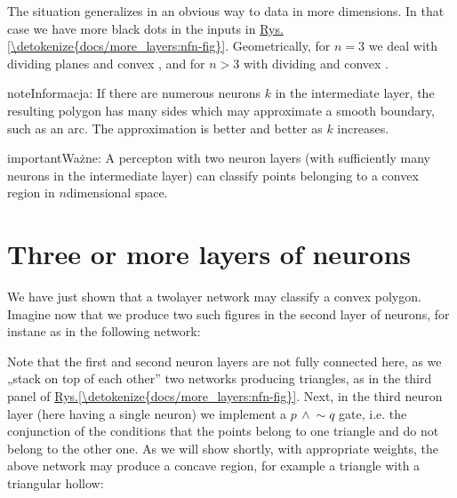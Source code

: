 \documentclass[a4paper,12pt,polish]{jupyterBook}
\begin{document}
\sphinxAtStartPar
The situation generalizes in an obvious way to data in more dimensions. In that case we have more black dots in the inputs in  \hyperref[\detokenize{docs/more_layers:nfn-fig}]{Rys.\@ \ref{\detokenize{docs/more_layers:nfn-fig}}}. Geometrically, for \(n=3\) we deal with dividing planes and convex , and for \(n>3\) with dividing  and convex .

\begin{sphinxadmonition}{note}{Informacja:}
\sphinxAtStartPar
If there are numerous neurons \(k\) in the intermediate layer, the resulting polygon has many sides which may approximate a smooth boundary, such as an arc. The approximation is better and better as \(k\) increases.
\end{sphinxadmonition}

\begin{sphinxadmonition}{important}{Ważne:}
\sphinxAtStartPar
A percepton with two neuron layers (with sufficiently many neurons in the intermediate layer) can classify points belonging to a convex region in \(n\)\sphinxhyphen{}dimensional space.
\end{sphinxadmonition}


\section{Three or more layers of neurons}
\label{\detokenize{docs/more_layers:three-or-more-layers-of-neurons}}
\sphinxAtStartPar
We have just shown that a two\sphinxhyphen{}layer network may classify a convex polygon. Imagine now that we produce two such figures in the second layer of neurons, for instane as in the following network:
\begin{sphinxVerbatimOutput}

\noindent{}
\end{sphinxVerbatimOutput}

\sphinxAtStartPar
Note that the first and second neuron layers are not fully connected here, as we „stack on top of each other” two networks producing triangles, as in the third panel of \hyperref[\detokenize{docs/more_layers:nfn-fig}]{Rys.\@ \ref{\detokenize{docs/more_layers:nfn-fig}}}. Next, in the third neuron layer (here having a single neuron) we implement a \(p \,\wedge \!\sim\!q\) gate, i.e. the conjunction of the conditions that the points belong to one triangle and do not belong to the other one. As we will show shortly, with appropriate weights, the above network may produce a concave region, for example a triangle with a triangular hollow:
\end{document}
